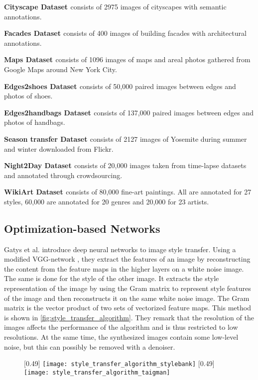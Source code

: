 \textbf{Cityscape Dataset \cite{Cordts2016}} consists of 2975 images of cityscapes with semantic annotations.

\textbf{Facades Dataset \cite{Tylecek2013}} consists of 400 images of building facades with architectural annotations.

\textbf{Maps Dataset \cite{Isola2016}} consists of 1096 images of maps and areal photos gathered from Google Maps around New York City.

\textbf{Edges2shoes Dataset \cite{Yu2014}} consists of 50,000 paired images between edges and photos of shoes.

\textbf{Edges2handbags Dataset \cite{Zhu2016}} consists of 137,000 paired images between edges and photos of handbags.

\textbf{Season transfer Dataset \cite{Zhu2017}} consists of 2127 images of Yosemite during summer and winter downloaded from Flickr.

\textbf{Night2Day Dataset \cite{Laffont2014}} consists of 20,000 images taken from time-lapse datasets and annotated through crowdsourcing.

\textbf{WikiArt Dataset \cite{Tan2018}} consists of 80,000 fine-art paintings.
All are annotated for 27 styles, 60,000 are annotated for 20 genres and 20,000 for 23 artists.

\subsection{Optimization-based Networks}
Gatys et al. \cite{Gatys2016} introduce deep neural networks to image style transfer.
Using a modified VGG-network \cite{Simonyan2015}, they extract the features of an image by reconstructing the content from the feature maps in the higher layers on a white noise image.
The same is done for the style of the other image.
It extracts the style representation of the image by using the Gram matrix to represent style features of the image and then reconstructs it on the same white noise image.
The Gram matrix is the vector product of two sets of vectorized feature maps.
This method is shown in \ref{fig:style_transfer_algorithm}.
They remark that the resolution of the images affects the performance of the algorithm and is thus restricted to low resolutions.
At the same time, the synthesized images contain some low-level noise, but this can possibly be removed with a denoiser.

\begin{figure}
	\centering
	 [0.49\textwidth] {
		\label{fig:style_transfer_algorithm_stylebank}
		\texttt{[image: style\_transfer\_algorithm\_stylebank]}%
	}
	 [0.49\textwidth] {
		\texttt{[image: style\_transfer\_algorithm\_taigman]}%
		\label{fig:style_transfer_algorithm_taigman}
	}
\end{figure}

